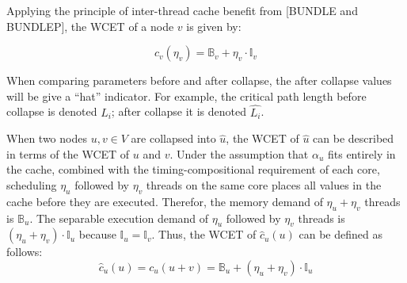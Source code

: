 Applying the principle of inter-thread cache benefit from \addcite{}
[BUNDLE and BUNDLEP], the WCET of a node ${v}$ is given by:

\begin{equation}
  c_v(\eta_v) = \mathbb{B}_v + \eta_v \cdot \mathbb{I}_v
\end{equation}

When comparing parameters before and after collapse, the after
collapse values will be give a ``hat'' indicator. For example, the
critical path length before collapse is denoted
${L_i}$; after collapse it is denoted ${\hat{L_i}}$.

When two nodes ${u,v \in V}$ are collapsed into ${\hat{u}}$, the WCET
of ${\hat{u}}$ can be described in terms of the WCET of ${u}$ and
${v}$. Under the assumption that ${\alpha_u}$ fits entirely in the
cache, combined with the timing-compositional 
requirement of each core, scheduling ${\eta_u}$ followed by ${\eta_v}$
threads on the same core places all values in the cache before they
are executed. Therefor, the memory demand of ${\eta_u + \eta_v}$
threads is ${\mathbb{B}_u}$. The separable execution demand of
${\eta_u}$ followed by ${\eta_v}$ threads is ${(\eta_u + \eta_v) \cdot
  \mathbb{I}_u}$ because ${\mathbb{I}_u = \mathbb{I}_v}$. Thus, the
WCET of ${\hat{c}_u(u)}$ can be defined as  
follows:
\begin{equation*}
  \hat{c}_u(u) = c_u(u + v) = \mathbb{B}_u + (\eta_u + \eta_v) \cdot
      \mathbb{I}_u 
\end{equation*}

